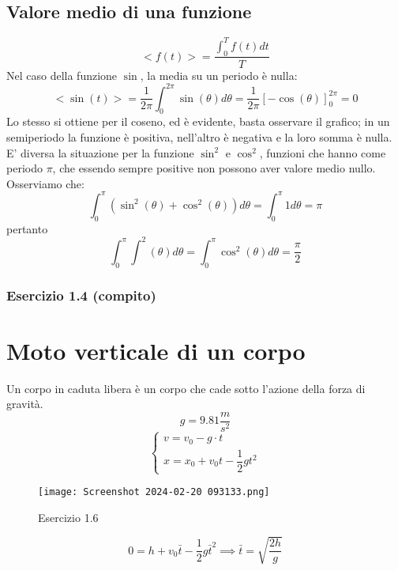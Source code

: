 \documentclass[../../main.tex]{subfiles}
\begin{document}
\subsection{Valore medio di una funzione}
\[
    <f(t)> = \dfrac{\int_{0}^{T} f(t) dt}{T}
\]
Nel caso della funzione $\sin$, la media su un periodo è nulla: \\
\[
    <\sin(t)> = \dfrac{1}{2\pi} \int_{0}^{2\pi} \sin(\theta) d\theta = \dfrac{1}{2\pi} \left[ -\cos(\theta) \right]_{0}^{2\pi} = 0
\]
Lo stesso si ottiene per il coseno, ed è evidente, basta osservare il grafico; in un semiperiodo la funzione è positiva, nell'altro è negativa e la loro somma è nulla.\\
E' diversa la situazione per la funzione $\sin^2$ e $\cos^2$, funzioni che hanno come periodo $\pi$, che essendo
sempre positive non possono aver valore medio nullo. Osserviamo che:
\[
    \int_0^\pi (\sin^2(\theta) + \cos^2(\theta)) d\theta = \int_0^\pi 1 d\theta = \pi
\]
pertanto
\[
    \int_0^\pi \int^2(\theta) d\theta = \int_0^\pi \cos^2(\theta) d\theta = \dfrac{\pi}{2}
\]

\subsubsection{Esercizio 1.4 (compito)}

\section{Moto verticale di un corpo}
Un corpo in caduta libera è un corpo che cade sotto l'azione della forza di gravità.\\
\[
    g = 9.81 \dfrac{m}{s^2}
\]
\[
    \begin{cases}
        v = v_0 - g \cdot t \\
        x = x_0 + v_0t - \dfrac{1}{2}gt^2
    \end{cases}
\]
\begin{figure}[!h]
    \centering
    \texttt{[image: Screenshot 2024-02-20 093133.png]}
    \caption{Esercizio 1.6}
\end{figure}\[
    0 = h +v_0\bar{t}-\frac{1}{2}g\bar{t}^2 \implies \bar{t} = \sqrt{\dfrac{2h}{g}}
\]
\end{document}
